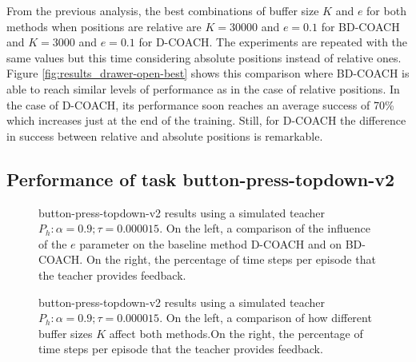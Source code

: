 From the previous analysis, the best combinations of buffer size $K$ and $e$ for both methods when positions are relative are $K=30000$ and $e=0.1$ for BD-COACH and $K=3000$ and $e=0.1$ for D-COACH. The experiments are repeated with the same values but this time considering absolute positions instead of relative ones. Figure \ref{fig:results_drawer-open-best}  shows this comparison where BD-COACH is able to reach similar levels of performance as in the case of relative positions. In the case of D-COACH, its performance soon reaches an average success of 70\% which increases just at the end of the training. Still, for D-COACH the difference in success between relative and absolute positions is remarkable.


\subsection{Performance of task button-press-topdown-v2}
\label{subsection:Performance of task button-press-topdown-v2}




 \begin{figure}[H]
  \centering
   \hfill
  \caption{button-press-topdown-v2 results using a simulated teacher $P_h: \alpha = 0.9; \tau =  0.000015$. On the left, a comparison of the influence of the $e$ parameter on the baseline method D-COACH and on BD-COACH. On the right, the percentage of time steps per episode that the teacher provides feedback.}
  \label{fig:results-button-press-topdown-v2-same-buffer}
\end{figure}


 \begin{figure}[H]
  \centering
   \hfill
  \caption{button-press-topdown-v2 results using a simulated teacher $P_h: \alpha = 0.9; \tau =  0.000015$. On the left, a comparison of how different buffer sizes $K$ affect both methods.On the right, the percentage of time steps per episode that the teacher  provides feedback.}
  \label{fig:results-button-press-topdown-v2-same-e}
\end{figure}


